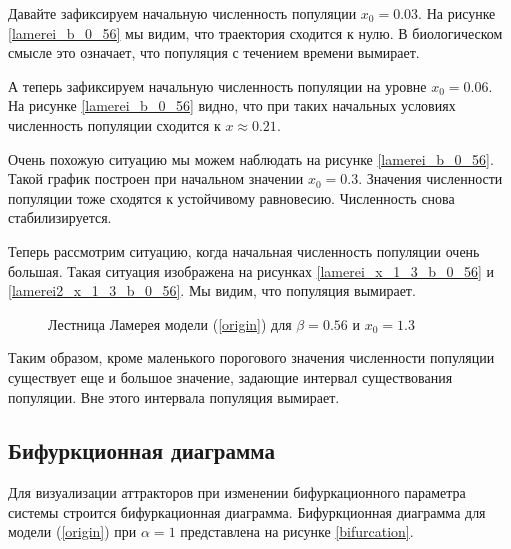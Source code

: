         Давайте зафиксируем начальную численность популяции \(x_0 = 0.03\). На рисунке \ref{lamerei_b_0_56} мы видим, что траектория сходится к нулю. В биологическом смысле это означает, что популяция с течением времени вымирает.
    
        А теперь зафиксируем начальную численность популяции на уровне \(x_0 = 0.06\). На рисунке \ref{lamerei_b_0_56} видно, что при таких начальных условиях численность популяции сходится к \(x \approx 0.21\).
            
        Очень похожую ситуацию мы можем наблюдать на рисунке \ref{lamerei_b_0_56}. Такой график построен при начальном значении \(x_0 = 0.3\). Значения численности популяции тоже сходятся к устойчивому равновесию. Численность снова стабилизируется.
            
        Теперь рассмотрим ситуацию, когда начальная численность популяции очень большая. Такая ситуация изображена на рисунках \ref{lamerei_x_1_3_b_0_56} и \ref{lamerei2_x_1_3_b_0_56}. Мы видим, что популяция вымирает.

        \begin{figure}
            \centering


            \captionsetup{justification=centering}
            \caption{Лестница Ламерея модели (\ref{origin}) для \(\beta = 0.56\) и \(x_0 = 1.3\)}
        \end{figure}

        Таким образом, кроме маленького порогового значения численности популяции существует еще и большое значение, задающие интервал существования популяции. Вне этого интервала популяция вымирает. 

    \subsection{Бифуркционная диаграмма}    

        Для визуализации аттракторов при изменении бифуркационного параметра системы строится бифуркационная диаграмма. Бифуркционная диаграмма для модели (\ref{origin}) при \(\alpha = 1\) представлена на рисунке \ref{bifurcation}.

